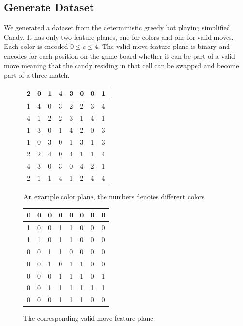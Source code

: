 \documentclass{kththesis}
\begin{document}
\subsection{Generate Dataset}
We generated a dataset from the deterministic greedy bot playing simplified Candy. It has only two feature planes, one for colors and one for valid moves. Each color is encoded $0 \leq c\leq 4$. The valid move feature plane is binary and encodes for each position on the game board whether it can be part of a valid move meaning that the candy residing in that cell can be swapped and become part of a three-match.\\

\begin{figure}[!tbp]
  \centering
  \begin{minipage}[b]{0.4\textwidth}
\begin{tabular}{|l|l|l|l|l|l|l|l|}
\hline
2&0&1&4&3&0&0&1\\
\hline
1&4&0&3&2&2&3&4\\
\hline
4&1&2&2&3&1&4&1\\ 
\hline
1&3&0&1&4&2&0&3\\
\hline
1&0&3&0&1&3&1&3\\ 
\hline
2&2&4&0&4&1&1&4\\
\hline
4&3&0&3&0&4&2&1\\ 
\hline
2&1&1&4&1&2&4&4\\
\hline
\end{tabular}
    \caption{An example color plane, the numbers denotes different colors\\}
  \end{minipage}
  \hfill
  \begin{minipage}[b]{0.4\textwidth}
\begin{tabular}{|l|l|l|l|l|l|l|l|}
\hline
0& 0& 0& 0& 0& 0& 0& 0\\
\hline
1& 0& 0& 1& 1& 0& 0& 0 \\
\hline
1& 1& 0& 1& 1& 0& 0& 0\\
\hline
0& 0& 1& 1& 0& 0& 0& 0 \\
\hline
0& 0& 1& 0& 1& 1& 0& 0 \\
\hline
0& 0& 0& 1& 1& 1& 0& 1 \\
\hline
0& 0& 1& 1& 1& 1& 1& 1 \\
\hline
0& 0& 0& 1& 1& 1& 0& 0 \\
\hline
\end{tabular}
    \caption{The corresponding valid move feature plane}
  \end{minipage}
\end{figure}
\end{document}
